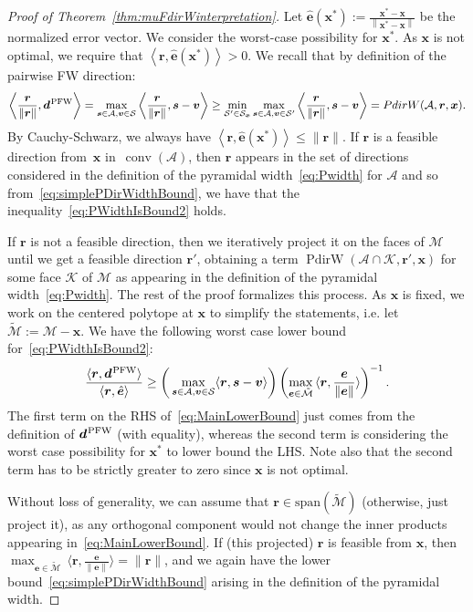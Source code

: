 \documentclass{article} %
\DeclareMathOperator*{\conv}{conv}
\providecommand{\norm}[1]{\left\lVert#1\right\rVert}
\newcommand{\domain}{\mathcal{M}} %
\newcommand{\PFW}{{\hspace{0.05em}\textnormal{PFW}}}
\newcommand{\x}{\bm{x}}
\newcommand{\s}{\bm{s}}
\newcommand{\dd}{\bm{d}}
\newcommand{\vv}{\bm{v}} %
\newcommand{\Vertices}{\mathcal{A}} %
\renewcommand{\S}{\mathcal{S}}
\renewcommand{\r}{\bm{r}}
\newcommand{\PdirW}{\mathop{PdirW}}
\newcommand{\innerProd}[2]{\left\langle #1 , #2 \right\rangle}
\newcommand{\innerProdCompressed}[2]{\langle #1 , #2 \rangle}
\newcommand{\Kface}{\mathcal{K}}
\newcommand{\err}{\bm{e}} %
\newcommand{\0}{\mathbf{0}} %
\begin{document}
\begin{proof}[Proof of Theorem~\ref{thm:muFdirWinterpretation}]
Let $\hat{\err}(\x^*) := \frac{\x^*-\x}{\norm{\x^*-\x}}$ be the normalized error vector. 
We consider the worst-case possibility for $\x^*$. As $\x$ is not optimal, we require that $\innerProd{\r}{ \hat{\err}(\x^*)} > 0$.
We recall that by definition of the pairwise FW direction:
%
\begin{equation} \label{eq:simplePDirWidthBound}
\innerProd{\frac{\r}{\|\r\|}}{\dd^\PFW} = \max_{\s \in \Vertices, \vv \in \S} \innerProd{\frac{\r}{\|\r\|}}{\s - \vv} 
\geq \min_{\S' \in \S_{\x}} \max_{\s \in \Vertices, \vv \in \S'} \innerProd{\frac{\r}{\|\r\|}}{\s - \vv} = \PdirW(\Vertices, \r, \x). 
\end{equation}
%
%
%
%
By Cauchy-Schwarz, we always have $\innerProd{\r}{\hat{\err}(\x^*)} \leq \|\r\|$. 
If $\r$ is a feasible direction from~$\x$ in~$\conv(\Vertices)$, then $\r$ appears in the set of directions
considered in the definition of the pyramidal width~\eqref{eq:Pwidth} for $\Vertices$ and so from~\eqref{eq:simplePDirWidthBound}, we have that the inequality~\eqref{eq:PWidthIsBound2} holds.

If $\r$ is not a feasible direction, then we iteratively project it on the faces of $\domain$ until we get a feasible direction $\r'$, obtaining a term $\PdirW(\Vertices \cap \Kface, \r', \x)$ for some 
face $\Kface$ of $\domain$ as appearing in the definition of the pyramidal width~\eqref{eq:Pwidth}. 
The rest of the proof formalizes this process. As $\x$ is fixed, 
we work on the centered polytope at $\x$ to simplify the statements, i.e. 
let $\tilde{\domain} := \domain - \x$. We have
the following worst case lower bound for~\eqref{eq:PWidthIsBound2}:
\begin{equation} \label{eq:MainLowerBound}
\frac{\innerProdCompressed{\r}{\dd^\PFW}}{\innerProdCompressed{\r}{\hat{\err}}} \geq
	\bigg( \max_{\s \in \Vertices, \vv \in \S} \innerProdCompressed{\r}{\s - \vv} \bigg)
	\left( \max_{\err \in \tilde{\domain}} \, \innerProdCompressed{\r}{\frac{\err}{\|\err\|}} \right)^{-1} . 
\end{equation}
The first term on the RHS of~\eqref{eq:MainLowerBound} just comes from the definition of
$\dd^\PFW$ (with equality), whereas the second term is considering the worst case
possibility for $\x^*$ to lower bound the LHS. Note also that the second term has to
be strictly greater to zero since $\x$ is not optimal.

Without loss of generality, we can assume that $\r \in \text{span}(\tilde{\domain})$ (otherwise, just project it),
as any orthogonal component would not change the inner products appearing in~\eqref{eq:MainLowerBound}.
If (this projected) $\r$ is feasible from $\x$, then $\max_{\err \in \tilde{\domain}} \, \innerProdCompressed{\r}{\frac{\err}{\|\err\|}} = \| \r \|$, and we again
have the lower bound~\eqref{eq:simplePDirWidthBound} arising in the definition
of the pyramidal width.


\end{proof}
\end{document}
